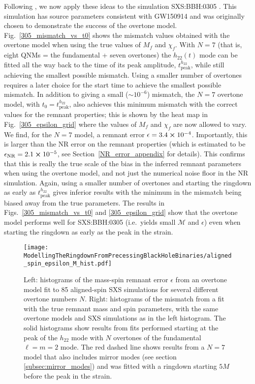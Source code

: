 Following \cite{Giesler:2019uxc}, we now apply these ideas to the simulation SXS:BBH:0305 \cite{Lovelace:2016uwp, sxs_catalog}.
This simulation has source parameters consistent with GW150914 and was originally chosen to demonstrate the success of the overtone model. 
Fig.~\ref{305_mismatch_vs_t0} shows the mismatch values obtained with the overtone model when using the true values of $M_f$ and $\chi_f$.
With $N=7$ (that is, eight QNMs = the fundamental + seven overtones) the $h_{22}(t)$ mode can be fitted all the way back to the time of its peak amplitude, $t_{\mathrm{peak}}^{h_{22}}$, while still achieving the smallest possible mismatch.
Using a smaller number of overtones requires a later choice for the start time to achieve the smallest possible mismatch.
In addition to giving a small ($\sim 10^{-6}$) mismatch, the $N=7$ overtone model, with $t_0 = t_{\mathrm{peak}}^{h_{22}}$, also achieves this minimum mismatch with the correct values for the remnant properties; this is shown by the heat map in Fig.~\ref{305_epsilon_grid} where the values of $M_f$ and $\chi_f$ are now allowed to vary. 
We find, for the $N=7$ model, a remnant error $\epsilon = 3.4 \cross 10^{-4}$. 
Importantly, this is larger than the NR error on the remnant properties (which is estimated to be $\epsilon_{\mathrm{NR}} = 2.1 \cross 10^{-5}$, see Section~\ref{NR_error_appendix} for details). This confirms that this is really the true scale of the bias in the inferred remnant parameters when using the overtone model, and not just the numerical noise floor in the NR simulation.
Again, using a smaller number of overtones and starting the ringdown as early as $t_{\mathrm{peak}}^{h_{22}}$ gives inferior results with the minimum in the mismatch being biased away from the true parameters.
The results in Figs.~\ref{305_mismatch_vs_t0} and \ref{305_epsilon_grid} show that the overtone model performs well for SXS:BBH:0305 (i.e.\ yields small $\mathcal{M}$ and $\epsilon$) even when starting the ringdown as early as the peak in the strain.

\begin{figure}[t]
    \centering
    \texttt{[image: ModellingTheRingdownFromPrecessingBlackHoleBinaries/aligned\_spin\_epsilon\_M\_hist.pdf]}
    \caption[Remnant error and mismatches for fits to aligned-spin SXS simulations using an overtone model]{Left: histograms of the mass-spin remnant error $\epsilon$ from an overtone model fit to 85 aligned-spin SXS simulations for several different overtone numbers $N$. 
    Right: histograms of the mismatch from a fit with the true remnant mass and spin parameters, with the same overtone models and SXS simulations as in the left histogram.
    The solid histograms show results from fits performed starting at the peak of the $h_{22}$ mode with $N$ overtones of the fundamental $\ell = m = 2$ mode.
    The red dashed line shows results from a $N=7$ model that also includes mirror modes (see section \ref{subsec:mirror_modes}) and was fitted with a ringdown starting $5M$ before the peak in the strain.}
    \label{aligned_spin_epsilon_hist}
\end{figure}

